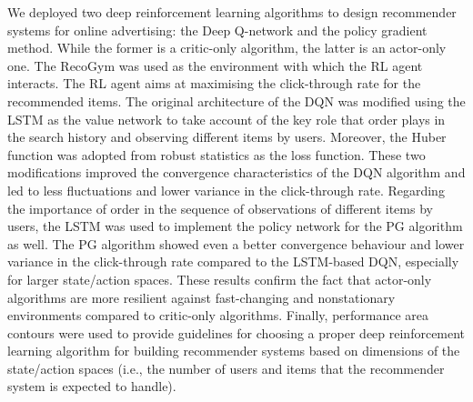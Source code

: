 \documentclass[journal]{IEEEtran}
\begin{document}
We deployed two deep reinforcement learning algorithms to design recommender systems for online advertising: the Deep Q-network and the policy gradient method. While the former is a critic-only algorithm, the latter is an actor-only one. The RecoGym was used as the environment with which the RL agent interacts. The RL agent aims at maximising the click-through rate for the recommended items. The original architecture of the DQN was modified using the LSTM as the value network to take account of the key role that order plays in the search history and observing different items by users. Moreover, the Huber function was adopted from robust statistics as the loss function. These two modifications improved the convergence characteristics of the DQN algorithm and led to less fluctuations and lower variance in the click-through rate. Regarding the importance of order in the sequence of observations of different items by users, the LSTM was used to implement the policy network for the PG algorithm as well. The PG algorithm showed even a better convergence behaviour and lower variance in the click-through rate compared to the LSTM-based DQN, especially for larger state/action spaces. These results confirm the fact that actor-only algorithms are more resilient against fast-changing and nonstationary environments compared to critic-only algorithms. Finally, performance area contours were used to provide guidelines for choosing a proper deep reinforcement learning algorithm for building recommender systems based on dimensions of the state/action spaces (i.e., the number of users and items that the recommender system is expected to handle).   





\end{document}
